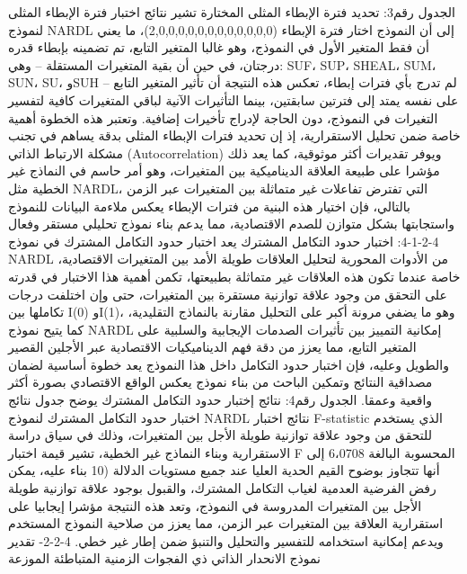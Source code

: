 \documentclass[12pt,a4paper]{report}
\begin{document}
الجدول رقم3: تحديد فترة الإبطاء المثلى المختارة
تشير نتائج اختبار فترة الإبطاء المثلى لنموذج NARDL إلى أن النموذج اختار فترة الإبطاء (2,0,0,0,0,0,0,0,0,0,0,0,0)، ما يعني أن فقط المتغير الأول في النموذج، وهو غالبا المتغير التابع، تم تضمينه بإبطاء قدره درجتان، في حين أن بقية المتغيرات المستقلة – وهي: SUF، SUP، SHEAL، SUM، SUN، SU، وSUH – لم تدرج بأي فترات إبطاء، تعكس هذه النتيجة أن تأثير المتغير التابع على نفسه يمتد إلى فترتين سابقتين، بينما التأثيرات الآنية لباقي المتغيرات كافية لتفسير التغيرات في النموذج، دون الحاجة لإدراج تأخيرات إضافية.
وتعتبر هذه الخطوة أهمية خاصة ضمن تحليل الاستقرارية، إذ إن تحديد فترات الإبطاء المثلى بدقة يساهم في تجنب مشكلة الارتباط الذاتي (Autocorrelation) ويوفر تقديرات أكثر موثوقية، كما يعد ذلك مؤشرا على طبيعة العلاقة الديناميكية بين المتغيرات، وهو أمر حاسم في النماذج غير الخطية مثل NARDL، التي تفترض تفاعلات غير متماثلة بين المتغيرات عبر الزمن بالتالي، فإن اختيار هذه البنية من فترات الإبطاء يعكس ملاءمة البيانات للنموذج واستجابتها بشكل متوازن للصدم الاقتصادية، مما يدعم بناء نموذج تحليلي مستقر وفعال 
4-2-1-4:  اختبار حدود التكامل المشترك 
يعد اختبار حدود التكامل المشترك في نموذج NARDL من الأدوات المحورية لتحليل العلاقات طويلة الأمد بين المتغيرات الاقتصادية، خاصة عندما تكون هذه العلاقات غير متماثلة بطبيعتها، تكمن أهمية هذا الاختبار في قدرته على التحقق من وجود علاقة توازنية مستقرة بين المتغيرات، حتى وإن اختلفت درجات تكاملها بين I(0) وI(1)، وهو ما يضفي مرونة أكبر على التحليل مقارنة بالنماذج التقليدية، كما يتيح نموذج NARDL إمكانية التمييز بين تأثيرات الصدمات الإيجابية والسلبية على المتغير التابع، مما يعزز من دقة فهم الديناميكيات الاقتصادية عبر الأجلين القصير والطويل وعليه، فإن اختبار حدود التكامل داخل هذا النموذج يعد خطوة أساسية لضمان مصداقية النتائج وتمكين الباحث من بناء نموذج يعكس الواقع الاقتصادي بصورة أكثر واقعية وعمقا.
الجدول رقم4: نتائج إختبار حدود التكامل المشترك
يوضح جدول نتائج اختبار حدود التكامل المشترك لنموذج NARDL نتائج اختبار F-statistic الذي يستخدم للتحقق من وجود علاقة توازنية طويلة الأجل بين المتغيرات، وذلك في سياق دراسة الاستقرارية وبناء النماذج غير الخطية، تشير قيمة اختبار F المحسوبة البالغة 6،0708 إلى أنها تتجاوز بوضوح القيم الحدية العليا عند جميع مستويات الدلالة (10%
بناء عليه، يمكن رفض الفرضية العدمية لغياب التكامل المشترك، والقبول بوجود علاقة توازنية طويلة الأجل بين المتغيرات المدروسة في النموذج، وتعد هذه النتيجة مؤشرا إيجابيا على استقرارية العلاقة بين المتغيرات عبر الزمن، مما يعزز من صلاحية النموذج المستخدم ويدعم إمكانية استخدامه للتفسير والتحليل والتنبؤ ضمن إطار غير خطي.
 4-2-2- تقدير نموذج الانحدار الذاتي ذي الفجوات الزمنية المتباطئة الموزعة
\end{document}
